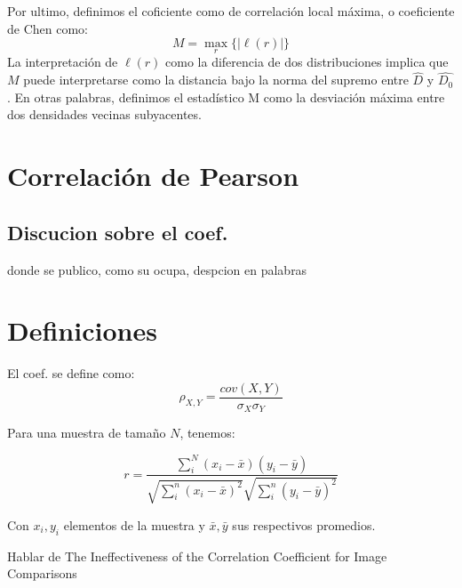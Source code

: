 	Por ultimo, definimos el coficiente como de correlaci\'on local m\'axima, o coeficiente de Chen como:
	$$
		M=\max _{r}\{|\ell(r)|\}
	$$
	La interpretaci\'on de $\ell(r)$ como la diferencia de dos distribuciones implica que $M$ puede interpretarse como la distancia bajo la norma del supremo entre $\widehat{D}$ y $\widehat{D_0}$. En otras palabras, definimos el estad\'istico M como la desviaci\'on m\'axima entre dos densidades vecinas subyacentes.


\section[]{Correlaci\'on de Pearson}

	\subsection{Discucion sobre el coef.}
	
		donde se publico, como su ocupa, despcion en palabras
	 
	\section{Definiciones}
	
	El coef. se define como:
	\begin{equation}\label{pearson_orig}
		\rho_{X,Y}=\frac{cov(X,Y)}{\sigma_X\sigma_Y}
	\end{equation}
	
	Para una muestra de tama\~no $N$, tenemos:
	
	\begin{equation}\label{pearson_r}
		r=\frac{\sum_{i}^N\left(x_{i}-\bar{x}\right)\left(y_{i}-\bar{y}\right)}{\sqrt{\sum_{i}^n\left(x_{i}-\bar{x}\right)^{2}} \sqrt{\sum_{i}^n\left(y_{i}-\bar{y}\right)^{2}}}
	\end{equation}
	
	Con $x_i,y_i$ elementos de la muestra y $\bar{x},\bar{y}$ sus respectivos promedios.
	
	Hablar de The Ineffectiveness of the Correlation Coefficient for Image Comparisons
	
	\newpage